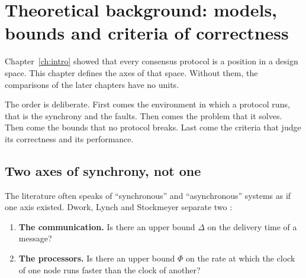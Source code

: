 %

\chapter{Theoretical background: models, bounds and criteria of
correctness}
\label{ch:background}

Chapter~\ref{ch:intro} showed that every consensus protocol is a
position in a design space. This chapter defines the axes of that space.
Without them, the comparisons of the later chapters have no units.

The order is deliberate. First comes the environment in which a protocol
runs, that is the synchrony and the faults. Then comes the problem that
it solves. Then come the bounds that no protocol breaks. Last come the
criteria that judge its correctness and its performance.

\section{Two axes of synchrony, not one}
\label{sec:synchrony}

The literature often speaks of \enquote{synchronous} and
\enquote{asynchronous} systems as if one axis existed. Dwork, Lynch and
Stockmeyer separate two \cite{dwork1988consensus}:

\begin{enumerate}[label=\textbf{(\alph*)},leftmargin=2.4em]
  \item \textbf{The communication.} Is there an upper bound $\Delta$ on
  the delivery time of a message?
  \item \textbf{The processors.} Is there an upper bound $\Phi$ on the
  rate at which the clock of one node runs faster than the clock of
  another?
\end{enumerate}

